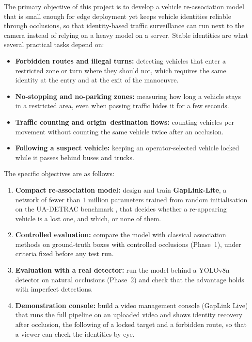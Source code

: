 The primary objective of this project is to develop a vehicle re-association model that is small enough for edge deployment yet keeps vehicle identities reliable through occlusions, so that identity-based traffic surveillance can run next to the camera instead of relying on a heavy model on a server. Stable identities are what several practical tasks depend on:
\begin{itemize}
    \item \textbf{Forbidden routes and illegal turns:} detecting vehicles that enter a restricted zone or turn where they should not, which requires the same identity at the entry and at the exit of the manoeuvre.
    \item \textbf{No-stopping and no-parking zones:} measuring how long a vehicle stays in a restricted area, even when passing traffic hides it for a few seconds.
    \item \textbf{Traffic counting and origin--destination flows:} counting vehicles per movement without counting the same vehicle twice after an occlusion.
    \item \textbf{Following a suspect vehicle:} keeping an operator-selected vehicle locked while it passes behind buses and trucks.
\end{itemize}

The specific objectives are as follows:
\begin{enumerate}
    \item \textbf{Compact re-association model:} design and train \textbf{GapLink-Lite}, a network of fewer than $1$ million parameters trained from random initialisation on the UA-DETRAC benchmark \cite{wen2020uadetrac}, that decides whether a re-appearing vehicle is a lost one, and which, or none of them.
    \item \textbf{Controlled evaluation:} compare the model with classical association methods on ground-truth boxes with controlled occlusions (Phase~1), under criteria fixed before any test run.
    \item \textbf{Evaluation with a real detector:} run the model behind a YOLOv8n detector on natural occlusions (Phase~2) and check that the advantage holds with imperfect detections.
    \item \textbf{Demonstration console:} build a video management console (GapLink Live) that runs the full pipeline on an uploaded video and shows identity recovery after occlusion, the following of a locked target and a forbidden route, so that a viewer can check the identities by eye.
\end{enumerate}

